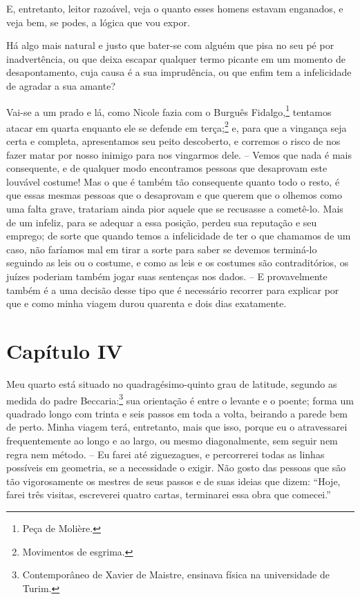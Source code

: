 E, entretanto, leitor razoável, veja o quanto esses homens estavam
enganados, e veja bem, se podes, a lógica que vou expor.

 Há algo mais natural e justo que bater-se com alguém que pisa no seu pé
por inadvertência, ou que deixa escapar qualquer termo picante em um
momento de desapontamento, cuja causa é a sua imprudência, ou que enfim
tem a infelicidade de agradar a sua amante?

 Vai-se a um prado e lá, como Nicole fazia com o Burguês
Fidalgo,\footnote{ Peça de Molière.} tentamos atacar em quarta
enquanto ele se defende em terça;\footnote{ Movimentos de esgrima.} 
e, para que a vingança seja certa e completa, apresentamos seu
peito descoberto, e corremos o risco de nos fazer matar por nosso
inimigo para nos vingarmos dele. -- Vemos que nada é mais consequente,
e de qualquer modo encontramos pessoas que desaprovam este louvável
costume! Mas o que é também tão consequente quanto todo o resto, é que
essas mesmas pessoas que o desaprovam e que querem que o olhemos como
uma falta grave, tratariam ainda pior aquele que se recusasse a
cometê-lo. Mais de um infeliz, para se adequar a essa posição, perdeu
sua reputação e seu emprego; de sorte que quando temos a infelicidade
de ter o que chamamos de um caso, não faríamos mal em tirar a sorte
para saber se devemos terminá-lo seguindo as leis ou o costume, e como
as leis e os costumes são contraditórios, os juízes poderiam também
jogar suas sentenças nos dados. -- E provavelmente também é a uma
decisão desse tipo que é necessário recorrer para explicar por que e
como minha viagem durou quarenta e dois dias exatamente.

\section{Capítulo IV}

 Meu quarto está situado no quadragésimo-quinto grau de latitude,
segundo as medida do padre Beccaria:\footnote{ Contemporâneo de Xavier
de Maistre, ensinava física na universidade de Turim.} sua
orientação é entre o levante e o poente; forma um quadrado longo com
trinta e seis passos em toda a volta, beirando a parede bem de perto.
Minha viagem terá, entretanto, mais que isso, porque eu o atravessarei
frequentemente ao longo e ao largo, ou mesmo diagonalmente, sem seguir
nem regra nem método. -- Eu farei até ziguezagues, e percorrerei todas
as linhas possíveis em geometria, se a necessidade o exigir. Não gosto
das pessoas que são tão vigorosamente os mestres de seus passos e de
suas ideias que dizem: ``Hoje, farei três visitas, escreverei quatro
cartas, terminarei essa obra que comecei.''

